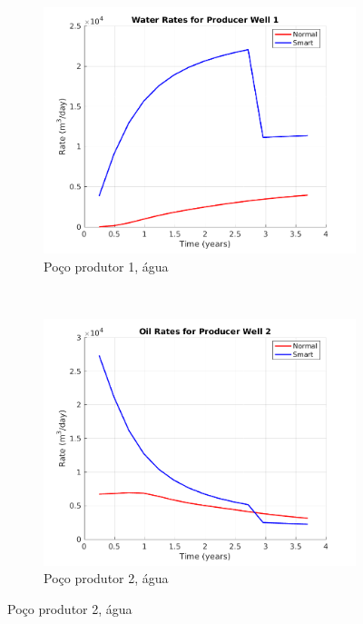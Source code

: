 \begin{figure}[!ht]
	\centering
	\begin{subfigure}[b]{.45\textwidth}
		\includegraphics[width=\textwidth]{figs/resultadosSSAIGUP/SSAIGUP_WaterWell1_Zoom}
		\caption{Po\c{c}o produtor 1, \'{a}gua}
		\label{SSAIGUP_WaterWell1}
	\end{subfigure}
	~
	\begin{subfigure}[b]{.45\textwidth}
		\includegraphics[width=\textwidth]{figs/resultadosSSAIGUP/SSAIGUP_OilWell2_Zoom}
		\caption{Po\c{c}o produtor 2, \'{a}gua}
		\label{SSAIGUP_WaterWell2}
	\end{subfigure}
	

\end{figure}
